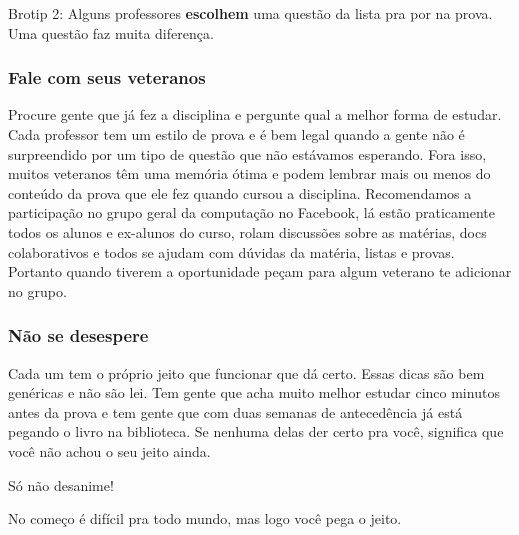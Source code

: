 Brotip 2: Alguns professores \textbf{escolhem} uma questão da lista pra por na prova. Uma questão faz muita diferença.

\subsubsection{Fale com seus veteranos}
Procure gente que já fez a disciplina e pergunte qual a melhor forma de estudar. Cada professor tem um estilo de prova e é bem legal quando a gente não é surpreendido por um tipo de questão que não estávamos esperando. Fora isso, muitos veteranos têm uma memória ótima e podem lembrar mais ou menos do conteúdo da prova que ele fez quando cursou a disciplina.
Recomendamos a participação no grupo geral da computação no Facebook, lá estão praticamente todos os alunos e ex-alunos do curso, rolam discussões sobre as matérias, docs colaborativos e todos se ajudam com dúvidas da matéria, listas e provas. Portanto quando tiverem a oportunidade peçam para algum veterano te adicionar no grupo.

\subsubsection{Não se desespere}
Cada um tem o próprio jeito que funcionar que dá certo. Essas dicas são bem genéricas e não são lei. Tem gente que acha muito melhor estudar cinco minutos antes da prova e tem gente que com duas semanas de antecedência já está pegando o livro na biblioteca. Se nenhuma delas der certo pra você, significa que você não achou o seu jeito ainda.

Só não desanime!

No começo é difícil pra todo mundo, mas logo você pega o jeito.

